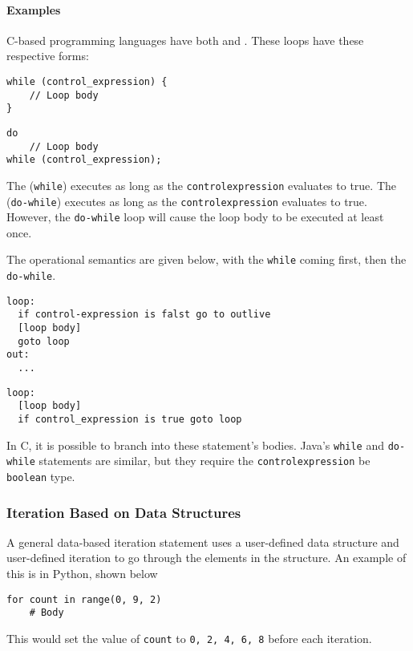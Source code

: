 \paragraph{Examples}\label{par:Logically_Controlled_Loops-Examples}
C-based programming languages have both  and  .
These loops have these respective forms:
\begin{verbatim}
while (control_expression) {
    // Loop body
}
\end{verbatim}
\begin{verbatim}
do
    // Loop body
while (control_expression);
\end{verbatim}

The  (\texttt{while}) executes as long as the \texttt{control\textunderscore{}expression} evaluates to true.
The  (\texttt{do-while}) executes as long as the \texttt{control\textunderscore{}expression} evaluates to true.
However, the \texttt{do-while} loop will cause the loop body to be executed at least once.

The operational semantics are given below, with the \texttt{while} coming first, then the \texttt{do-while}.
\begin{verbatim}
loop:
  if control-expression is falst go to outlive
  [loop body]
  goto loop
out:
  ...
\end{verbatim}

\begin{verbatim}
loop:
  [loop body]
  if control_expression is true goto loop
\end{verbatim}

In C, it is possible to branch into these statement's bodies.
Java's \texttt{while} and \texttt{do-while} statements are similar, but they require the \texttt{control\textunderscore{}expression} be \texttt{boolean} type.

\subsubsection{Iteration Based on Data Structures}\label{subsubsec:Iteration_Based_on_Data_Structures}
A general data-based iteration statement uses a user-defined data structure and user-defined iteration to go through the elements in the structure.
An example of this is in Python, shown below
\begin{verbatim}
for count in range(0, 9, 2)
    # Body
\end{verbatim}
This would set the value of \texttt{count} to \texttt{0, 2, 4, 6, 8} before each iteration.

